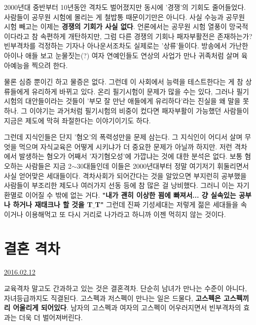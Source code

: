 2000년대 중반부터 10년동안 격차도 벌어졌지만 동시에 '경쟁'의 기회도 줄어들었다.
사람들이 공무원 시험에 몰리는 게 철밥통 때문이기만은 아니다.
사실 수능과 공무원 시험 빼고는 이제는 \textbf{경쟁의 기회가 사실 없다}.
언론에서는 공무원 시험 열풍이 망국적이다라고 참 속편하게 개탄하지만, 그럼 다른 경쟁의 기회나 패자부활전은 존재하는가?
빈부격차를 걱정하는 기자나 아나운서조차도 실제로는 '상류'들이다.
방송에서 가난한 아이나 애들 보고 눈물짓는(?) 여자 연예인들도 연상의 사업가 만나 귀족처럼 살며 육아예능을 찍으려 한다.
\vspace{5mm}

물론 심증 뿐이긴 하고 물증은 없다. 그런데 이 사회에서 능력을 테스트한다는 게 참 상류들에게 유리하게 바뀌고 있다.
온리 필기시험이 문제가 많을 수는 있다, 그러나 필기시험의 대안들이라는 것들이 '부모 잘 만난 애들에게 유리하다'라는 진실을 왜 말을 못 하나.
그 이야기는 과거처럼 필기시험의 비중이 컸다면 패자부활이 가능했던 사람들이 지금은 제도에 막혀 좌절한다는 이야기이기도 하다.
\vspace{5mm}

그런데 지식인들은 단지 '혐오'의 폭력성만을 문제 삼는다.
그 지식인이 어디서 살며 무엇을 먹으며 자식교육은 어떻게 시키냐가 더 중요한 문제가 아닐까 하지만.
저런 격차에서 발생하는 혐오가 어째서 '자기혐오성'에 가깝냐는 것에 대한 분석은 없다.
보통 혐오하는 사람들은 지금 2$\sim$30대들인데 이들은 2000년대부터 정말 여기저기 휘둘리면서 사실 얻어맞은 세대들이다.
격차사회가 되어간다는 것을 알았으면 부지런히 공부했을 사람들이 부조리한 제도나 여러가지 선동 등에 참 많은 걸 낭비했다.
그러니 이는 자기 환멸로 이어질 수 밖에 없는 거다. \textbf{"내가 괜히 이상한 꾐에 빠져서... 걍 실속있는 공부나 하거나 재태크나 할 것을 T$\_$T"}
그런데 진짜 기성세대는 저렇게 젊은 세대들을 속이거나 이용해먹고 또 다시 거리로 나가라고 하니까 이젠 먹히지 않는 것이다.
\vspace{5mm}






\section{결혼 격차}
\href{https://www.kockoc.com/Apoc/633064}{2016.02.12}

\vspace{5mm}

교육격차 말고도 간과하고 있는 것은 결혼격차.
단순히 남녀가 만나는 수준이 아니다, 자녀등급까지도 직결된다.
고스펙과 저스펙이 만나는 일은 드물다, \textbf{고스펙은 고스펙끼리 어울리게 되어있다}.
남자의 고스펙과 여자의 고스펙이 어우러지면서 빈부격차의 효과는 더욱 더 벌어져버린다.
\vspace{5mm}

